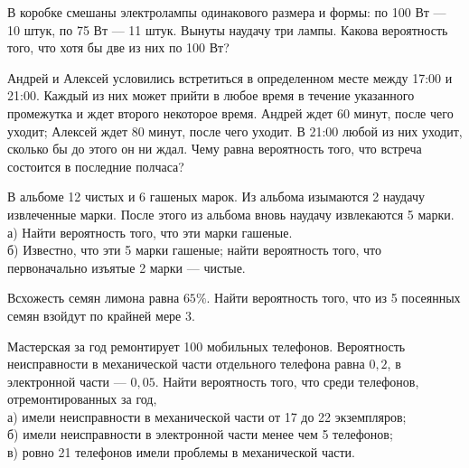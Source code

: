 \newpage\setcounter{zad}{0}



\begin{zkrW}{20}\noindent 
	В коробке смешаны электролампы одинакового размера и формы: по 100 Вт --- 10 штук, по 75 Вт --- 11 штук. Вынуты наудачу три лампы. Какова вероятность того, что хотя бы две из них по 100 Вт?
 
\end{zkrW}

\begin{zkrW}{20}\noindent 
	Андрей и Алексей условились встретиться в определенном месте между 17:00 и 21:00. Каждый из них может прийти в любое время в течение указанного промежутка и ждет второго некоторое время. Андрей ждет 60 минут, после чего уходит; Алексей ждет 80 минут, после чего уходит. В 21:00 любой из них уходит, сколько бы до этого он ни ждал. Чему равна вероятность того, что встреча состоится в последние полчаса?
 
\end{zkrW}

\begin{zkrW}{20}\noindent 
	В альбоме 12 чистых и 6 гашеных марок. Из альбома изымаются 2 наудачу извлеченные марки. После этого из альбома вновь наудачу извлекаются 5 марки. \\ \indent а) Найти вероятность того, что эти марки гашеные. \\ \indent б) Известно, что эти 5 марки гашеные; найти вероятность того, что первоначально изъятые 2 марки --- чистые.
 
\end{zkrW}

\begin{zkrW}{20}\noindent 
	Всхожесть семян лимона равна $65\%$. Найти вероятность того, что из 5 посеянных семян взойдут по крайней мере 3.
 
\end{zkrW}

\begin{zkrW}{20}\noindent 
	Мастерская за год ремонтирует 100 мобильных телефонов. Вероятность неисправности в механической части отдельного телефона равна $0{,}2$, в электронной части --- $0{,}05$. Найти вероятность того, что среди телефонов, отремонтированных за год, \\ \indent а) имели неисправности в механической части от 17 до 22 экземпляров; \\ \indent б) имели неисправности в электронной части менее чем 5 телефонов; \\ \indent в) ровно 21 телефонов имели проблемы в механической части.
 
\end{zkrW}

